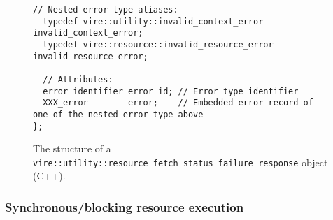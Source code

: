\begin{itemize}
\begin{figure}[h]
\begin{Verbatim}[frame=single,xleftmargin=0.cm,label=\fbox{C++}]
  // Nested error type aliases:
  typedef vire::utility::invalid_context_error   invalid_context_error;
  typedef vire::resource::invalid_resource_error invalid_resource_error;

  // Attributes:
  error_identifier error_id; // Error type identifier
  XXX_error        error;    // Embedded error record of one of the nested error type above
};
\end{Verbatim}
\normalsize
\caption{The structure of a \texttt{vire::utility::resource\_fetch\_status\_failure\_response} object
  (C++).}
\label{fig-app-payload-resource_fetch_status_failure_response}
\end{figure}


\end{itemize}


\vfill
\pagebreak
\clearpage

\subsubsection{Synchronous/blocking resource execution}

\begin{center}
\end{center}

